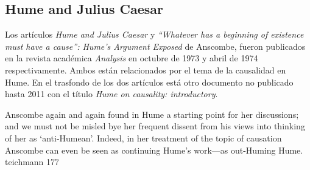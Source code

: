 












\subsection{Hume and Julius Caesar}

Los artículos \emph{Hume and Julius Caesar} y \emph{``Whatever has a beginning
  of existence must have a cause'': Hume’s Argument Exposed} de Anscombe, fueron
publicados en la revista académica \emph{Analysis} en octubre de 1973 y abril de
1974 respectivamente. Ambos están relacionados por el tema de la causalidad en
Hume. En el trasfondo de los dos artículos está otro documento no publicado
hasta 2011 con el título \emph{Hume on causality: introductory}.

Anscombe again and again found in Hume a starting point for her discussions; and
we must not be misled bye her frequent dissent from his views into thinking of
her as `anti-Humean'. Indeed, in her treatment of the topic of causation
Anscombe can even be seen as continuing Hume's work---as out-Huming Hume.
teichmann 177

